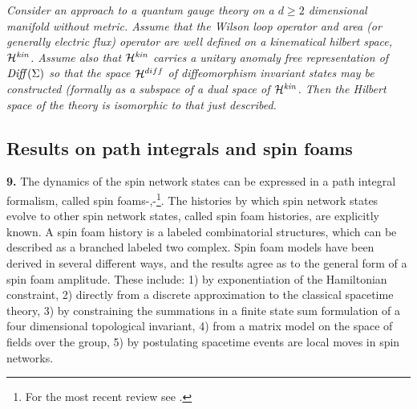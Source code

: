 \documentclass[12pt]{article}
\def\Diff{\mathop{\it Diff}}
\begin{document}
{\it Consider an
approach to a quantum gauge theory on a $d \geq 2$ dimensional 
manifold without metric. Assume that the Wilson loop 
operator and area (or generally electric flux) operator are well defined on a kinematical
 hilbert space,  ${\cal H}^{\it kin}$. Assume also that ${\cal H}^{\it kin}$ 
carries a unitary anomaly free representation
of $\Diff(\Sigma )$ so that the space ${\cal H}^{diff}$ of diffeomorphism 
invariant states may be constructed (formally as a subspace of a dual space of  ${\cal H}^{\it kin}$. 
Then the Hilbert space of the theory is isomorphic to that just described. }
  
  \subsection{Results on path integrals and spin foams}
  
  {\bf 9.}  The dynamics of the spin network states can be expressed
  in a path integral formalism, called
  spin foams\cite{baezfoam}-\cite{alejandro-review},\cite{F-foam}-\cite{BC}\footnote{For the most 
  recent review see \cite{alejandro-review}.}.
  The histories by which spin network
  states evolve to other spin network states, called spin foam
  histories,  are explicitly known.
  A spin foam history is a labeled combinatorial
  structures, which can be described as a branched labeled two complex.
Spin foam models have
  been derived in  several different ways, and the results
  agree as to the general form of a spin foam amplitude. These
include: 1) by exponentiation of the Hamiltonian
  constraint, 2) directly from a discrete approximation
  to the classical spacetime theory, 3)  by constraining the
  summations in a finite state sum formulation of a four dimensional
  topological invariant, 4) from a matrix model on the space of
  fields over the group, 5) by postulating spacetime events are local
  moves in spin networks.
\end{document}
